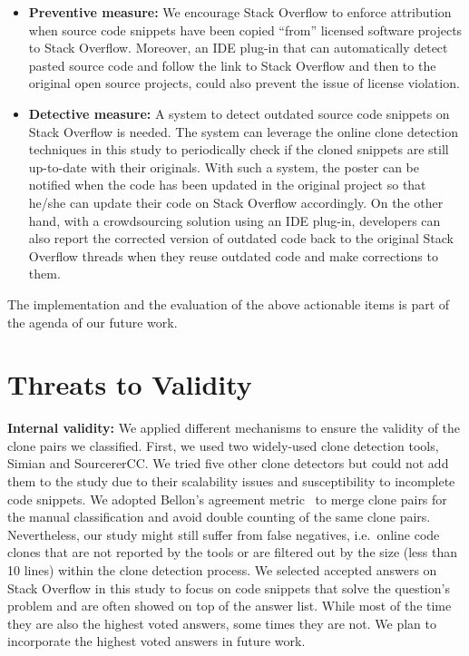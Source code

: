 \documentclass[10pt,journal,compsoc]{IEEEtran}
\begin{document}
\begin{itemize} 
	\item \textbf{Preventive measure:} We
	encourage Stack Overflow to enforce attribution when source code snippets have
	been copied ``from'' licensed software projects to Stack Overflow. Moreover, an
	IDE plug-in that can automatically detect pasted source code and follow the link
	to Stack Overflow and then to the original open source projects, could also
	prevent the issue of license violation. 
	\item \textbf{Detective measure:} A
	system to detect outdated source code snippets on Stack Overflow is needed. The
	system can leverage the online clone detection techniques in this study to
	periodically check if the cloned snippets are still up-to-date with their
	originals. %
	With such a system, the poster can be notified when the code has been updated
	in the original project so that he/she can update their code on Stack Overflow
	accordingly. On the other hand, with a crowdsourcing solution using an IDE
	plug-in, developers can also report the corrected version of outdated code back
	to the original Stack Overflow threads when they reuse outdated code and make
	corrections to them. 
\end{itemize} 

The implementation and the evaluation of the
above actionable items is part of the agenda of our future work.

\section{Threats to Validity}

\textbf{Internal validity:} 
We applied different mechanisms to ensure the validity of the clone pairs we
classified.  First, we used two widely-used clone detection tools, Simian and
SourcererCC.  We tried five other clone detectors but could not add them to the
study due to their scalability issues and susceptibility to incomplete code
snippets. We adopted Bellon's agreement metric~\cite{Bellon2007} to merge clone
pairs for the manual classification and avoid double counting of the same clone
pairs. Nevertheless, our study might still suffer from false negatives,
i.e.~online code clones that are not reported by the tools or are filtered out
by the size (less than 10 lines) within the clone detection process. We selected
accepted answers on Stack Overflow in this study to focus on code snippets that
solve the question's problem and are often showed on top of the answer list.
While most of the time they are also the highest voted answers, some
times they are not. We plan to incorporate the highest voted answers in 
future work.
\end{document}
